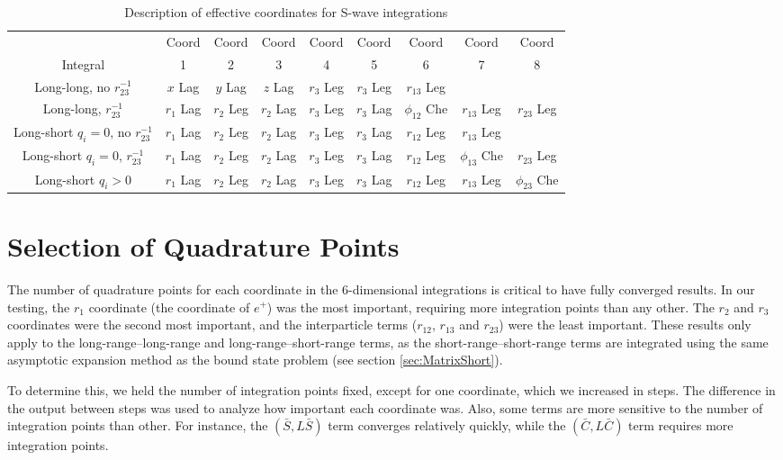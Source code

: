 \documentclass[Dissertation.tex]{subfiles}
\begin{document}
\begin{table}[H]
\centering
\begin{tabular}{|c|c|c|c|c|c|c|c|c|}
\hline
 & Coord & Coord & Coord & Coord & Coord & Coord & Coord & Coord\\
Integral & 1 & 2 & 3 & 4 & 5 & 6 & 7 & 8 \\
\hline
 Long-long, no $r_{23}^{-1}$ & $x$ Lag & $y$ Lag & $z$ Lag & $r_3$ Leg & $r_3$ Leg & $r_{13}$ Leg & & \\
 Long-long, $r_{23}^{-1}$ & $r_1$ Lag & $r_2$ Leg & $r_2$ Lag & $r_3$ Leg & $r_3$ Lag & $\phi_{12}$ Che & $r_{13}$ Leg & $r_{23}$ Leg \\
\hline
 Long-short $q_i = 0$, no $r_{23}^{-1}$ & $r_1$ Lag & $r_2$ Leg & $r_2$ Lag & $r_3$ Leg & $r_3$ Lag & $r_{12}$ Leg & $r_{13}$ Leg & \\
 Long-short $q_i = 0$, $r_{23}^{-1}$ & $r_1$ Lag & $r_2$ Leg & $r_2$ Lag & $r_3$ Leg & $r_3$ Lag & $r_{12}$ Leg & $\phi_{13}$ Che & $r_{23}$ Leg \\
 Long-short $q_i > 0$ & $r_1$ Lag & $r_2$ Leg & $r_2$ Lag & $r_3$ Leg & $r_3$ Lag & $r_{12}$ Leg & $r_{13}$ Leg & $\phi_{23}$ Che \\
\hline
\end{tabular}
\caption{Description of effective coordinates for S-wave integrations}
\label{tab:EffectiveCoords}
\end{table}


\section{Selection of Quadrature Points}
\label{sec:SelQuadPoints1}
The number of quadrature points for each coordinate in the 6-dimensional integrations is critical to have fully converged results. In our testing, the $r_1$ coordinate (the coordinate of $e^+$) was the most important, requiring more integration points than any other. The $r_2$ and $r_3$ coordinates were the second most important, and the interparticle terms ($r_{12}$, $r_{13}$ and $r_{23}$) were the least important. These results only apply to the long-range--long-range and long-range--short-range terms, as the short-range--short-range terms are integrated using the same asymptotic expansion method as the bound state problem (see section \ref{sec:MatrixShort}).

To determine this, we held the number of integration points fixed, except for one coordinate, which we increased in steps. The difference in the output between steps was used to analyze how important each coordinate was. Also, some terms are more sensitive to the number of integration points than other. For instance, the $(\bar{S},L\bar{S})$ term converges relatively quickly, while the $(\bar{C},L\bar{C})$ term requires more integration points.
\end{document}
